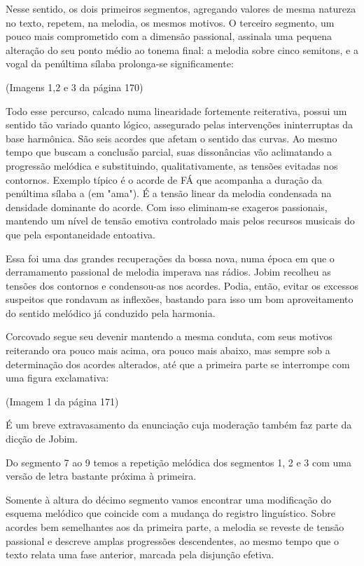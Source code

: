 Nesse sentido, os dois primeiros segmentos, agregando valores de mesma
natureza no texto, repetem, na melodia, os mesmos motivos. O terceiro
segmento, um pouco mais comprometido com a dimensão passional, assinala
uma pequena alteração do seu ponto médio ao tonema final: a melodia
sobre cinco semitons, e a vogal da penúltima sílaba prolonga-se
significamente:

(Imagens 1,2 e 3 da página 170)

Todo esse percurso, calcado numa linearidade fortemente reiterativa,
possui um sentido tão variado quanto lógico, assegurado pelas
intervenções ininterruptas da base harmônica. São seis acordes que
afetam o sentido das curvas. Ao mesmo tempo que buscam a conclusão
parcial, suas dissonâncias vão aclimatando a progressão melódica e
substituindo, qualitativamente, as tensões evitadas nos contornos.
Exemplo típico é o acorde de FÁ que acompanha a duração da penúltima
sílaba a (em "ama"). É a tensão linear da melodia condensada na
densidade dominante do acorde. Com isso eliminam-se exageros passionais,
mantendo um nível de tensão emotiva controlado mais pelos recursos
musicais do que pela espontaneidade entoativa.

Essa foi uma das grandes recuperações da bossa nova, numa época em que o
derramamento passional de melodia imperava nas rádios. Jobim recolheu as
tensões dos contornos e condensou-as nos acordes. Podia, então, evitar
os excessos suspeitos que rondavam as inflexões, bastando para isso um
bom aproveitamento do sentido melódico já conduzido pela harmonia.

Corcovado segue seu devenir mantendo a mesma conduta, com seus motivos
reiterando ora pouco mais acima, ora pouco mais abaixo, mas sempre sob a
determinação dos acordes alterados, até que a primeira parte se
interrompe com uma figura exclamativa:

(Imagem 1 da página 171)

É um breve extravasamento da enunciação cuja moderação também faz parte
da dicção de Jobim.

Do segmento 7 ao 9 temos a repetição melódica dos segmentos 1, 2 e 3 com
uma versão de letra bastante próxima à primeira.

Somente à altura do décimo segmento vamos encontrar uma modificação do
esquema melódico que coincide com a mudança do registro linguístico.
Sobre acordes bem semelhantes aos da primeira parte, a melodia se
reveste de tensão passional e descreve amplas progressões descendentes,
ao mesmo tempo que o texto relata uma fase anterior, marcada pela
disjunção efetiva.


